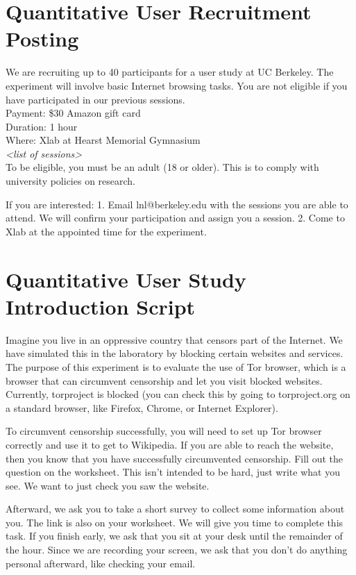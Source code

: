 \documentclass[USenglish,oneside,twocolumn]{article}
\begin{document}
\section{Quantitative User Recruitment Posting}
\label{quantitative-recruitment}
We are recruiting up to 40 participants for a user study at UC Berkeley. The experiment will involve basic Internet browsing tasks. You are not eligible if you have participated in our previous sessions.\\

\indent Payment: \$30 Amazon gift card\\
\indent Duration: 1 hour \\
\indent Where: Xlab at Hearst Memorial Gymnasium\\

\textit{<list of sessions>}\\

To be eligible, you must be an adult (18 or older). This is to comply with university policies on research. 

If you are interested: 1. Email lnl@berkeley.edu with the sessions you are able to attend. We will confirm your participation and assign you a session. 2. Come to Xlab at the appointed time for the experiment.

\section{Quantitative User Study Introduction Script} 
\label{quantitative-script} 
Imagine you live in an oppressive country that censors part of the Internet. We have simulated this in the laboratory by blocking certain websites and services.  The purpose of this experiment is to evaluate the use of Tor browser, which is a browser that can circumvent censorship and let you visit blocked websites. Currently, torproject is blocked (you can check this by going to torproject.org on a standard browser, like Firefox, Chrome, or Internet Explorer). 

To circumvent censorship successfully, you will need to set up Tor browser correctly and use it to get to Wikipedia. If you are able to reach the website, then you know that you have successfully circumvented censorship. Fill out the question on the worksheet. This isn't intended to be hard, just write what you see. We want to just check you saw the website. 

Afterward, we ask you to take a short survey to collect some information about you. The link is also on your worksheet.
We will give you time to complete this task. If you finish early, we ask that you sit at your desk until the remainder of the hour. Since we are recording your screen, we ask that you don't do anything personal afterward, like checking your email.
\end{document}
